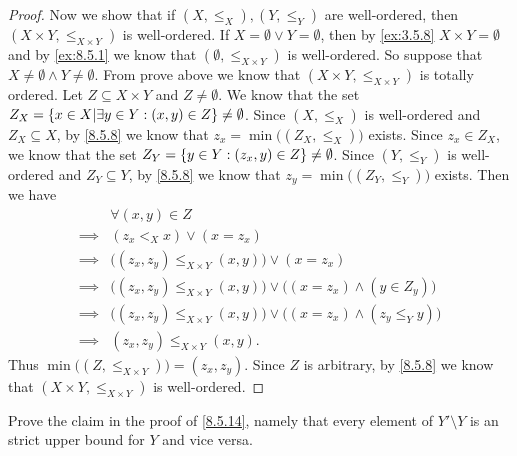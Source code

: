 \begin{proof}
  Now we show that if \((X, \leq_X), (Y, \leq_Y)\) are well-ordered, then \((X \times Y, \leq_{X \times Y})\) is well-ordered.
  If \(X = \emptyset \lor Y = \emptyset\), then by \cref{ex:3.5.8} \(X \times Y = \emptyset\) and by \cref{ex:8.5.1} we know that \((\emptyset, \leq_{X \times Y})\) is well-ordered.
  So suppose that \(X \neq \emptyset \land Y \neq \emptyset\).
  From prove above we know that \((X \times Y, \leq_{X \times Y})\) is totally ordered.
  Let \(Z \subseteq X \times Y\) and \(Z \neq \emptyset\).
  We know that the set \(Z_X = \left\lbrace x \in X | \exists y \in Y : (x, y) \in Z\right\rbrace \neq \emptyset\).
  Since \((X, \leq_X)\) is well-ordered and \(Z_X \subseteq X\), by \cref{8.5.8} we know that \(z_x = \min\big((Z_X, \leq_X)\big)\) exists.
  Since \(z_x \in Z_X\), we know that the set \(Z_Y = \left\lbrace y \in Y : (z_x, y) \in Z\right\rbrace \neq \emptyset\).
  Since \((Y, \leq_Y)\) is well-ordered and \(Z_Y \subseteq Y\), by \cref{8.5.8} we know that \(z_y = \min\big((Z_Y, \leq_Y)\big)\) exists.
  Then we have
  \begin{align*}
             & \forall (x, y) \in Z                                                                        \\
    \implies & (z_x <_X x) \lor (x = z_x)                                                                  \\
    \implies & \big((z_x, z_y) \leq_{X \times Y} (x, y)\big) \lor (x = z_x)                                \\
    \implies & \big((z_x, z_y) \leq_{X \times Y} (x, y)\big) \lor \big((x = z_x) \land (y \in Z_y)\big)    \\
    \implies & \big((z_x, z_y) \leq_{X \times Y} (x, y)\big) \lor \big((x = z_x) \land (z_y \leq_Y y)\big) \\
    \implies & (z_x, z_y) \leq_{X \times Y} (x, y).
  \end{align*}
  Thus \(\min\big((Z, \leq_{X \times Y})\big) = (z_x, z_y)\).
  Since \(Z\) is arbitrary, by \cref{8.5.8} we know that \((X \times Y, \leq_{X \times Y})\) is well-ordered.
\end{proof}

\begin{ex}\label{ex:8.5.13}
  Prove the claim in the proof of \cref{8.5.14}, namely that every element of \(Y' \setminus Y\) is an strict upper bound for \(Y\) and vice versa.
\end{ex}


